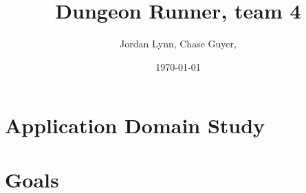 
    \title{Dungeon Runner, team 4}
    \author{Jordan Lynn, Chase Guyer, }

    \date{\today}
    \maketitle

    \section{Application Domain Study}
    
    \section{}
    
    \section{Goals}
    
    \section{}


